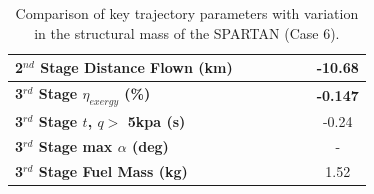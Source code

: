 \begin{table}[ht]
\begin{tabular}{l c c c c c c}
		\textbf{2$^{nd}$ Stage Distance Flown (km)}
		& \SecondDistmSPARTANNinetyFiveNoReturn
		& \SecondDistmSPARTANNinetySevenFiveNoReturn
		& \SecondDistmSPARTANStandardNoReturn
		& \SecondDistmSPARTANOneHundredTwoFiveNoReturn
		& \SecondDistmSPARTANOneHundredFiveNoReturn
		&-10.68
		\\
		\hline 
		\textbf{3$^{rd}$ Stage $\eta_{exergy}$ (\%)}
		& \textbf{\thirddExergyEffmSPARTANNinetyFiveNoReturn}
		& \textbf{\thirddExergyEffmSPARTANNinetySevenFiveNoReturn}
		& \textbf{\thirddExergyEffmSPARTANStandardNoReturn}
		& \textbf{\thirddExergyEffmSPARTANOneHundredTwoFiveNoReturn}
		& \textbf{\thirddExergyEffmSPARTANOneHundredFiveNoReturn}
		& \textbf{-0.147}
		\\
	
		\textbf{3$^{rd}$ Stage $t$, $q >$ 5kpa (s)}
		& \thirdqOverFivemSPARTANNinetyFiveNoReturn
		& \thirdqOverFivemSPARTANNinetySevenFiveNoReturn
		& \thirdqOverFivemSPARTANStandardNoReturn
		& \thirdqOverFivemSPARTANOneHundredTwoFiveNoReturn
		& \thirdqOverFivemSPARTANOneHundredFiveNoReturn
		&-0.24
		\\
		\textbf{3$^{rd}$ Stage max $\alpha$ (deg)}
		& \thirdmaxAoAmSPARTANNinetyFiveNoReturn
		& \thirdmaxAoAmSPARTANNinetySevenFiveNoReturn
		& \thirdmaxAoAmSPARTANStandardNoReturn
		& \thirdmaxAoAmSPARTANOneHundredTwoFiveNoReturn
		& \thirdmaxAoAmSPARTANOneHundredFiveNoReturn
		& -
		\\
		\textbf{3$^{rd}$ Stage Fuel Mass (kg)}
		& \thirdmFuelmSPARTANNinetyFiveNoReturn
		& \thirdmFuelmSPARTANNinetySevenFiveNoReturn
		& \thirdmFuelmSPARTANStandardNoReturn
		& \thirdmFuelmSPARTANOneHundredTwoFiveNoReturn
		& \thirdmFuelmSPARTANOneHundredFiveNoReturn
		&1.52
		\\
		\hline 
	\end{tabular}  
\caption{Comparison of key trajectory parameters with variation in the structural mass of the SPARTAN (Case 6).}
\label{tab:comparison100}
	
\end{table}


